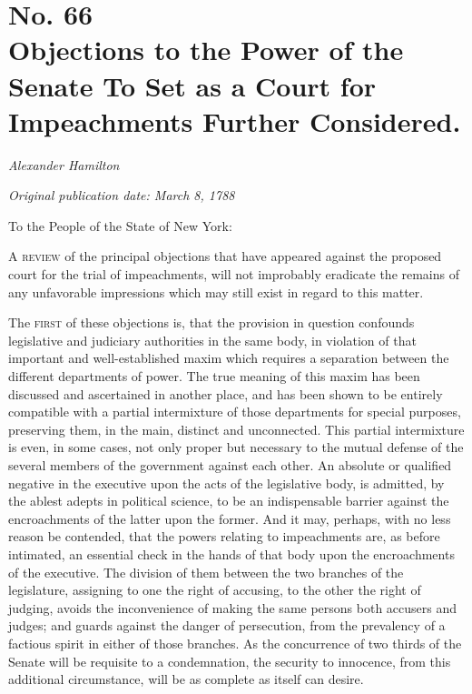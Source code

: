 \chapter[No. 66: Objections to the Power of the Senate To Set as a Court for Impeachments Further Considered.]{No. 66\\ {\small Objections to the Power of the Senate To Set as a Court for Impeachments Further Considered.}}

\textit{Alexander Hamilton}

\textit{Original publication date: March 8, 1788}
\vspace{1cm}

To the People of the State of New York:
\vspace{.4cm}

\textsc{A review} of the principal objections that have appeared against the proposed court for the trial of impeachments, will not improbably eradicate the remains of any unfavorable impressions which may still exist in regard to this matter.

The \textsc{first} of these objections is, that the provision in question confounds legislative and judiciary authorities in the same body, in violation of that important and well-established maxim which requires a separation between the different departments of power. 
The true meaning of this maxim has been discussed and ascertained in another place, and has been shown to be entirely compatible with a partial intermixture of those departments for special purposes, preserving them, in the main, distinct and unconnected. 
This partial intermixture is even, in some cases, not only proper but necessary to the mutual defense of the several members of the government against each other. 
An absolute or qualified negative in the executive upon the acts of the legislative body, is admitted, by the ablest adepts in political science, to be an indispensable barrier against the encroachments of the latter upon the former. 
And it may, perhaps, with no less reason be contended, that the powers relating to impeachments are, as before intimated, an essential check in the hands of that body upon the encroachments of the executive. 
The division of them between the two branches of the legislature, assigning to one the right of accusing, to the other the right of judging, avoids the inconvenience of making the same persons both accusers and judges; and guards against the danger of persecution, from the prevalency of a factious spirit in either of those branches. 
As the concurrence of two thirds of the Senate will be requisite to a condemnation, the security to innocence, from this additional circumstance, will be as complete as itself can desire.

